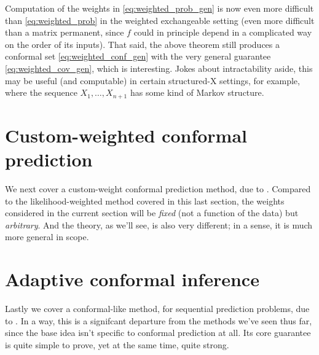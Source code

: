 \documentclass{article}
\begin{document}
Computation of the weights in \eqref{eq:weighted_prob_gen} is now even more
difficult than \eqref{eq:weighted_prob} in the weighted exchangeable setting
(even more difficult than a matrix permanent, since $f$ could in principle
depend in a complicated way on the order of its inputs). That said, the above
theorem still produces a conformal set \eqref{eq:weighted_conf_gen} with the
very general guarantee \eqref{eq:weighted_cov_gen}, which is interesting.
Jokes about intractability aside, this may be useful (and computable) in certain
structured-X settings, for example, where the sequence $X_1,\dots,X_{n+1}$ has
some kind of Markov structure. 

\section{Custom-weighted conformal prediction}

We next cover a custom-weight conformal prediction method, due to
\citet{barber2022conformal}. Compared to the likelihood-weighted method covered 
in this last section, the weights considered in the current section will be
\emph{fixed} (not a function of the data) but \emph{arbitrary}. And the theory,
as we'll see, is also very different; in a sense, it is much more general in scope.          

\section{Adaptive conformal inference}

Lastly we cover a conformal-like method, for sequential prediction problems, due 
to \citet{gibbs2021adaptive}. In a way, this is a signifcant departure from the
methods we've seen thus far, since the base idea isn't specific to conformal
prediction at all. Its core guarantee is quite simple to prove, yet at the same
time, quite strong.    



\end{document}
